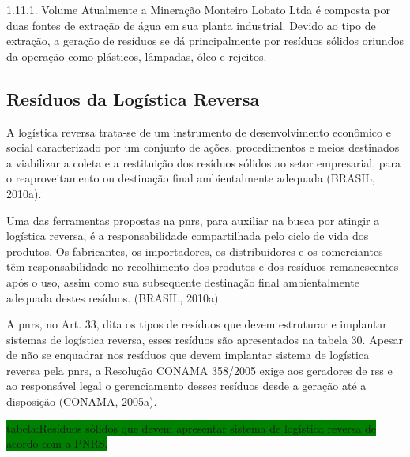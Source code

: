 	1.11.1. Volume
	Atualmente a Mineração Monteiro Lobato Ltda é composta por duas fontes de extração de água em sua planta industrial. Devido ao tipo de extração, a geração de resíduos se dá principalmente por resíduos sólidos oriundos da operação como plásticos, lâmpadas, óleo e rejeitos.
	
	
	\subsection{Resíduos da Logística Reversa}
	A logística reversa trata-se de um instrumento de desenvolvimento econômico e social caracterizado por um conjunto de ações, procedimentos e meios destinados a viabilizar a coleta e a restituição dos resíduos sólidos ao setor empresarial, para o reaproveitamento ou destinação final ambientalmente adequada (BRASIL, 2010a). 
	
	Uma das ferramentas propostas na \gls{pnrs}, para auxiliar na busca por atingir a logística reversa, é a responsabilidade compartilhada pelo ciclo de vida dos produtos. Os fabricantes, os importadores, os distribuidores e os comerciantes têm responsabilidade no recolhimento dos produtos e dos resíduos remanescentes após o uso, assim como sua subsequente destinação final ambientalmente adequada destes resíduos. (BRASIL, 2010a)
	
	A \gls{pnrs}, no Art. 33, dita os tipos de resíduos que devem estruturar e implantar sistemas de logística reversa, esses resíduos são apresentados na tabela 30. Apesar de não se enquadrar nos resíduos que devem implantar sistema de logística reversa pela \gls{pnrs}, a Resolução CONAMA 358/2005 exige aos geradores de \gls{rss} e ao responsável legal o gerenciamento desses resíduos desde a geração até a disposição (CONAMA, 2005a).
	
	\colorbox{green}{tabela:Resíduos sólidos que devem apresentar sistema de logística reversa de acordo com a PNRS.}
	
